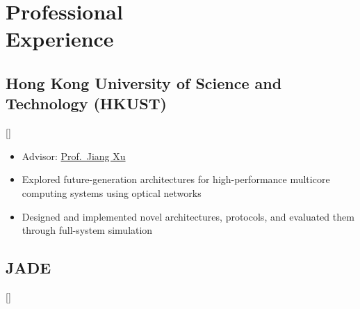 \documentclass{mycv}
\begin{document}
\maketitle%

%
%

\section{Professional \\ Experience}

\subsection{Hong Kong University of Science and Technology (HKUST)}[]
\begin{positions}
\end{positions}

\begin{itemize}
  \item Advisor: \href{https://eexu.home.ece.ust.hk/}{Prof.~Jiang Xu}
  \item Explored future-generation architectures for high-performance multicore computing systems using optical networks 
  \item Designed and implemented novel architectures, protocols, and evaluated them through full-system simulation
\end{itemize}

\subsection{JADE}[]
\begin{positions}
\end{positions}
\end{document}
